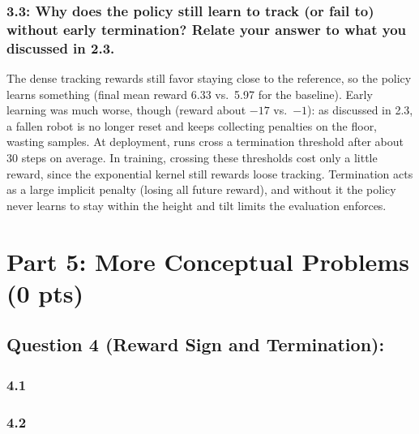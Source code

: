 \documentclass[12pt]{article}
\begin{document}
\subsubsection*{3.3: Why does the policy still learn to track (or fail to) without early termination? Relate your answer to what you discussed in 2.3.}
\begin{solution}[height=7cm]
The dense tracking rewards still favor staying close to the reference, so the policy learns something (final mean reward 6.33 vs.\ 5.97 for the baseline). Early learning was much worse, though (reward about $-17$ vs.\ $-1$): as discussed in 2.3, a fallen robot is no longer reset and keeps collecting penalties on the floor, wasting samples. At deployment, runs cross a termination threshold after about 30 steps on average. In training, crossing these thresholds cost only a little reward, since the exponential kernel still rewards loose tracking. Termination acts as a large implicit penalty (losing all future reward), and without it the policy never learns to stay within the height and tilt limits the evaluation enforces.
\end{solution}


\newpage
\section*{Part 5: More Conceptual Problems (0 pts)}

\subsection*{Question 4 (Reward Sign and Termination):}

\subsubsection*{4.1}
\begin{solution}[height=6cm]
\end{solution}

\subsubsection*{4.2}
\begin{solution}[height=6cm]
\end{solution}
\end{document}
